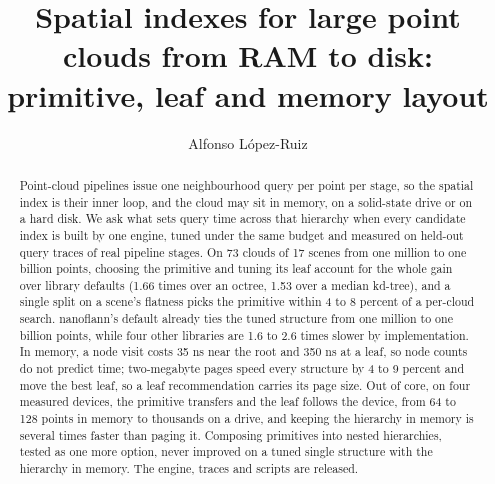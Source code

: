 \documentclass[a4paper,fleqn]{cas-dc}
\newif\ifanonymous
\begin{document}
\let\WriteBookmarks\relax
\def\floatpagepagefraction{1}
\def\textpagefraction{.001}

\ifanonymous
  \shortauthors{Anonymous}
\else
\fi

\title[mode = title]{Spatial indexes for large point clouds from RAM to disk: primitive, leaf and memory layout}

\ifanonymous
  \author[1]{Anonymous authors}
  \affiliation[1]{organization={Anonymized for review}}
\else
  \author[1]{Alfonso L\'opez-Ruiz}
  \cormark[1]
\fi

\begin{abstract}
Point-cloud pipelines issue one neighbourhood query per point per stage, so the spatial index is their inner loop, and the cloud may sit in memory, on a solid-state drive or on a hard disk. We ask what sets query time across that hierarchy when every candidate index is built by one engine, tuned under the same budget and measured on held-out query traces of real pipeline stages. On 73 clouds of 17 scenes from one million to one billion points, choosing the primitive and tuning its leaf account for the whole gain over library defaults (1.66 times over an octree, 1.53 over a median kd-tree), and a single split on a scene's flatness picks the primitive within 4 to 8 percent of a per-cloud search. nanoflann's default already ties the tuned structure from one million to one billion points, while four other libraries are 1.6 to 2.6 times slower by implementation. In memory, a node visit costs 35 ns near the root and 350 ns at a leaf, so node counts do not predict time; two-megabyte pages speed every structure by 4 to 9 percent and move the best leaf, so a leaf recommendation carries its page size. Out of core, on four measured devices, the primitive transfers and the leaf follows the device, from 64 to 128 points in memory to thousands on a drive, and keeping the hierarchy in memory is several times faster than paging it. Composing primitives into nested hierarchies, tested as one more option, never improved on a tuned single structure with the hierarchy in memory. The engine, traces and scripts are released.
\end{abstract}
\end{document}
